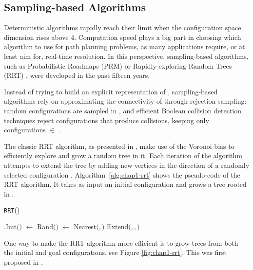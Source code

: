 \subsection{Sampling-based Algorithms}
\label{subsec:chap1-sampling-algorithms}

Deterministic algorithms rapidly reach their limit when the
configuration space dimension rises above 4. Computation speed plays a
big part in choosing which algorithm to use for path planning
problems, as many applications require, or at least aim for, real-time
resolution. In this perspective, sampling-based algorithms, such as
Probabilistic Roadmaps (PRM) \cite{kavr96} or Rapidly-exploring Random
Trees (RRT) \cite{kuff00}, were developed in the past fifteen years.

Instead of trying to build an explicit representation of {\cfree},
sampling-based algorithms rely on approximating the connectivity of
{\cfree} through rejection sampling: random configurations 
are sampled in {\cspace}, and efficient Boolean collision detection
techniques \cite{huds97, gott96} reject configurations that produce
collisions, keeping only configurations \config{} $\in$ {\cfree}.

The classic RRT algorithm, as presented in \cite{kuff00}, make use of
the Voronoi bias to efficiently explore {\cfree} and grow a random tree
in it. Each iteration of the algorithm attempts to extend the tree by
adding new vertices in the direction of a randomly selected
configuration . Algorithm~\ref{alg:chap1-rrt} shows the
pseudo-code of the RRT algorithm. It takes as input an initial
configuration  and grows a tree {\ctree} rooted in .

\begin{algorithm}
\caption{\texttt{RRT}()}
\label{alg:chap1-rrt}
\begin{algorithmic}
\STATE {\ctree}$.$Init$($$)$
\STATE {} $ \leftarrow $ Rand$(${\cspace}$)$
\STATE {}$ \leftarrow $ Nearest$($$,${\ctree}$)$
\STATE Extend$(${\ctree}$,$$,$$)$
\ENDFOR
\end{algorithmic}
\end{algorithm}

One way to make the RRT algorithm more efficient is to grow trees from
both the initial and goal configurations, see Figure
\ref{fig:chap1-rrt}. This was first proposed in \cite{kuff00}.

